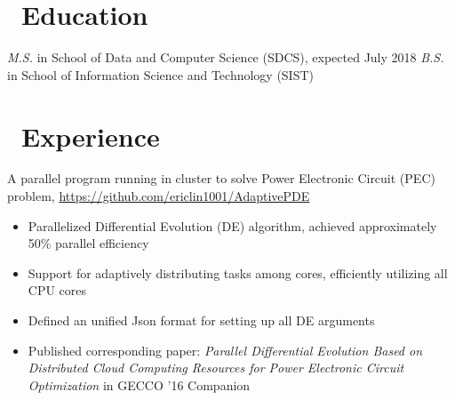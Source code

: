 \documentclass{resume}
\begin{document}


\basicInfo{
	\email{nameljh1001@gmail.com} \textperiodcentered\ 
	\phone{(+86) 135-8053-2764} 
}

\section{\faGraduationCap\ Education}
\textit{M.S.} in School of Data and Computer Science (SDCS), expected July 2018
\textit{B.S.} in School of Information Science and Technology (SIST)

\section{\faUsers\ Experience}
A parallel program running in cluster to solve Power Electronic Circuit (PEC) problem, \url{https://github.com/ericlin1001/AdaptivePDE}
\begin{itemize}
	\item Parallelized Differential Evolution (DE) algorithm, achieved approximately 50\% parallel efficiency
	\item Support for adaptively distributing tasks among cores, efficiently utilizing all CPU cores
	\item Defined an unified Json format for setting up all DE arguments
	\item Published corresponding paper: \textit{Parallel Differential Evolution Based on Distributed Cloud Computing Resources for Power Electronic Circuit Optimization} in GECCO '16 Companion 
\end{itemize}

\end{document}

